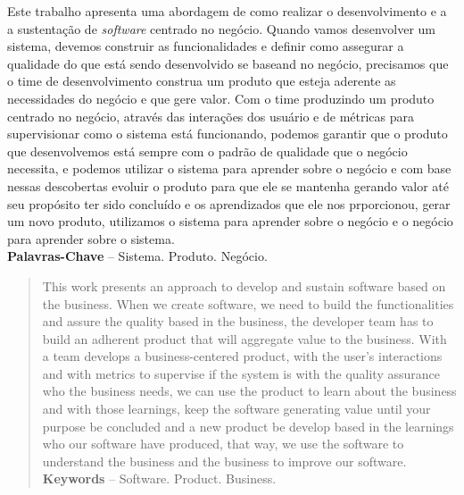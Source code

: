 \begin{resumo}
  Este trabalho apresenta uma abordagem de como realizar o desenvolvimento e a
  a sustentação de \textit{software} centrado no negócio. Quando vamos
  desenvolver um sistema, devemos construir as funcionalidades e definir como
  assegurar a qualidade do que está sendo desenvolvido se baseand no
  negócio, precisamos que o time de desenvolvimento construa um produto que esteja
  aderente as necessidades do negócio e que gere valor. Com o time produzindo
  um produto centrado no negócio, através das interações dos usuário e de métricas
  para supervisionar como o sistema está funcionando, podemos garantir que o
  produto que desenvolvemos está sempre com o padrão de qualidade que o negócio
  necessita, e podemos utilizar o sistema para aprender sobre o negócio e com
  base nessas descobertas evoluir o produto para que ele se mantenha gerando valor
  até seu propósito ter sido concluído e os aprendizados que ele nos prporcionou,
  gerar um novo produto, utilizamos o sistema para aprender sobre o negócio e o
  negócio para aprender sobre o sistema. \\[3\baselineskip]

  \textbf{Palavras-Chave} -- Sistema. Produto. Negócio.
\end{resumo}

\begin{abstract}
  This work presents an approach to develop and sustain software based on the
  business. When we create software, we need to build the functionalities and
  assure the quality based in the business, the developer team has to build an
  adherent product that will aggregate value to the business. With a team develops
  a business-centered product, with the user's interactions and with metrics to
  supervise if the system is with the quality assurance who the business needs,
  we can use the product to learn about the business and with those learnings,
  keep the software generating value until your purpose be concluded and a new
  product be develop based in the learnings who our software have produced, that
  way, we use the software to understand the business and the business to improve
  our software. \\[3\baselineskip]

  \textbf{Keywords} -- Software. Product. Business.
\end{abstract}
